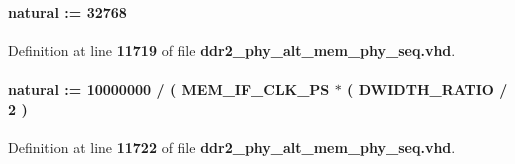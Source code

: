 \paragraph[{c\+\_\+done\+\_\+timeout\+\_\+count}]{ {\bfseries \textcolor{comment}{natural}\textcolor{vhdlchar}{ }\textcolor{vhdlchar}{ }\textcolor{vhdlchar}{\+:}\textcolor{vhdlchar}{=}\textcolor{vhdlchar}{ }\textcolor{vhdlchar}{ } \textcolor{vhdldigit}{32768} \textcolor{vhdlchar}{ }} \hspace{0.3cm}{\ttfamily [Constant]}}\label{classddr2__phy__alt__mem__phy__ctrl_1_1struct_a38b174130eaba626f7a75be0a94faa39}


Definition at line {\bf 11719} of file {\bf ddr2\+\_\+phy\+\_\+alt\+\_\+mem\+\_\+phy\+\_\+seq.\+vhd}.

\paragraph[{c\+\_\+ticks\+\_\+per\+\_\+10us}]{ {\bfseries \textcolor{comment}{natural}\textcolor{vhdlchar}{ }\textcolor{vhdlchar}{ }\textcolor{vhdlchar}{\+:}\textcolor{vhdlchar}{=}\textcolor{vhdlchar}{ }\textcolor{vhdlchar}{ } \textcolor{vhdldigit}{10000000} \textcolor{vhdlchar}{/}\textcolor{vhdlchar}{ }\textcolor{vhdlchar}{(}\textcolor{vhdlchar}{ }\textcolor{vhdlchar}{ }\textcolor{vhdlchar}{ }\textcolor{vhdlchar}{ }{\bfseries {\bf M\+E\+M\+\_\+\+I\+F\+\_\+\+C\+L\+K\+\_\+\+PS}} \textcolor{vhdlchar}{$\ast$}\textcolor{vhdlchar}{ }\textcolor{vhdlchar}{(}\textcolor{vhdlchar}{ }\textcolor{vhdlchar}{ }\textcolor{vhdlchar}{ }\textcolor{vhdlchar}{ }{\bfseries {\bf D\+W\+I\+D\+T\+H\+\_\+\+R\+A\+T\+IO}} \textcolor{vhdlchar}{/}\textcolor{vhdlchar}{ } \textcolor{vhdldigit}{2} \textcolor{vhdlchar}{ }\textcolor{vhdlchar}{)}\textcolor{vhdlchar}{ }} \hspace{0.3cm}{\ttfamily [Constant]}}\label{classddr2__phy__alt__mem__phy__ctrl_1_1struct_a136bac186e0d0d09e829f588fa9e7daf}


Definition at line {\bf 11722} of file {\bf ddr2\+\_\+phy\+\_\+alt\+\_\+mem\+\_\+phy\+\_\+seq.\+vhd}.

